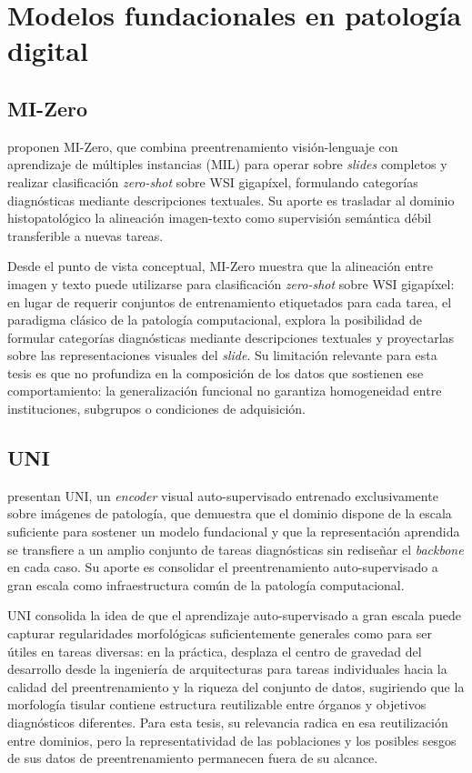 \section{Modelos fundacionales en patología digital}

\subsection{MI-Zero}

\textcite{lu2023visuallanguagepretrainedmultiple} proponen MI-Zero, que combina preentrenamiento visión-lenguaje con aprendizaje de múltiples instancias (MIL) para operar sobre \textit{slides} completos y realizar clasificación \textit{zero-shot} sobre WSI gigapíxel, formulando categorías diagnósticas mediante descripciones textuales. Su aporte es trasladar al dominio histopatológico la alineación imagen-texto como supervisión semántica débil transferible a nuevas tareas.

Desde el punto de vista conceptual, MI-Zero muestra que la alineación entre imagen y texto puede utilizarse para clasificación \textit{zero-shot} sobre WSI gigapíxel: en lugar de requerir conjuntos de entrenamiento etiquetados para cada tarea, el paradigma clásico de la patología computacional, explora la posibilidad de formular categorías diagnósticas mediante descripciones textuales y proyectarlas sobre las representaciones visuales del \textit{slide}. Su limitación relevante para esta tesis es que no profundiza en la composición de los datos que sostienen ese comportamiento: la generalización funcional no garantiza homogeneidad entre instituciones, subgrupos o condiciones de adquisición.

\subsection{UNI}

\textcite{chen2024uni} presentan UNI, un \textit{encoder} visual auto-supervisado entrenado exclusivamente sobre imágenes de patología, que demuestra que el dominio dispone de la escala suficiente para sostener un modelo fundacional y que la representación aprendida se transfiere a un amplio conjunto de tareas diagnósticas sin rediseñar el \textit{backbone} en cada caso. Su aporte es consolidar el preentrenamiento auto-supervisado a gran escala como infraestructura común de la patología computacional.

UNI consolida la idea de que el aprendizaje auto-supervisado a gran escala puede capturar regularidades morfológicas suficientemente generales como para ser útiles en tareas diversas: en la práctica, desplaza el centro de gravedad del desarrollo desde la ingeniería de arquitecturas para tareas individuales hacia la calidad del preentrenamiento y la riqueza del conjunto de datos, sugiriendo que la morfología tisular contiene estructura reutilizable entre órganos y objetivos diagnósticos diferentes. Para esta tesis, su relevancia radica en esa reutilización entre dominios, pero la representatividad de las poblaciones y los posibles sesgos de sus datos de preentrenamiento permanecen fuera de su alcance.


